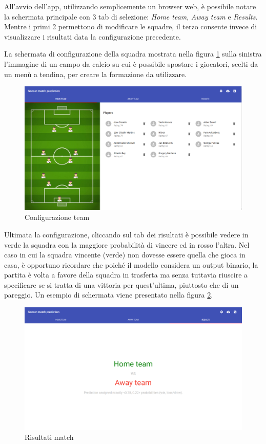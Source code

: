 \documentclass[hidelinks, 12pt]{article}
\begin{document}
All'avvio dell'app, utilizzando semplicemente un browser web, è possibile notare la schermata principale con 3 tab di selezione: {\it Home team}, {\it Away team} e {\it Results}. Mentre i primi 2 permettono di modificare le squadre, il terzo consente invece di visualizzare i risultati data la configurazione precedente.

La schermata di configurazione della squadra mostrata nella figura \ref{fig:team_config} sulla sinistra l'immagine di un campo da calcio su cui è possibile spostare i giocatori, scelti da un menù a tendina, per creare la formazione da utilizzare. 

\begin{figure}[H]
	\centering
	\includegraphics[scale=0.35]{images/07_02_team_config.png}
	\caption[Configurazione team]{Configurazione team}
	\label{fig:team_config}
\end{figure}

Ultimata la configurazione, cliccando sul tab dei risultati è possibile vedere in verde la squadra con la maggiore probabilità di vincere ed in rosso l'altra. Nel caso in cui la squadra vincente (verde) non dovesse essere quella che gioca in casa, è opportuno ricordare che poiché il modello considera un output binario, la partita è volta a favore della squadra in trasferta ma senza tuttavia riuscire a specificare se si tratta di una vittoria per quest'ultima, piuttosto che di un pareggio. Un esempio di schermata viene presentato nella figura \ref{fig:match_result}. 

\begin{figure}
	\centering
	\includegraphics[scale=0.3]{images/07_02_match_result.png}
	\caption[Risultati match]{Risultati match}
	\label{fig:match_result}
\end{figure}
\end{document}
